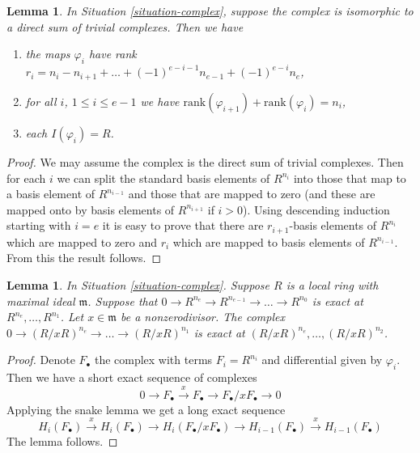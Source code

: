 \documentclass{amsart}
\theoremstyle{plain}
\newtheorem{lemma}[subsection]{Lemma}
\theoremstyle{definition}
\theoremstyle{remark}
\numberwithin{equation}{subsection}
\begin{document}
\begin{lemma}
\label{lemma-trivial-case-exact}
In Situation \ref{situation-complex}, suppose the complex is
isomorphic to a direct sum of trivial complexes. Then
we have
\begin{enumerate}
\item the maps $\varphi_i$ have rank
$r_i = n_i - n_{i + 1} + \ldots + (-1)^{e-i-1} n_{e-1} + (-1)^{e-i} n_e$,
\item for all $i$, $1 \leq i \leq e - 1$ we have
$\text{rank}(\varphi_{i + 1}) + \text{rank}(\varphi_i) = n_i$,
\item each $I(\varphi_i) = R$.
\end{enumerate}
\end{lemma}

\begin{proof}
We may assume the complex is the direct sum of trivial
complexes. Then for each $i$ we can split the standard basis
elements of $R^{n_i}$ into those that map to a basis element
of $R^{n_{i-1}}$ and those that are mapped to zero (and these
are mapped onto by basis elements of $R^{n_{i + 1}}$ if $i > 0$).
Using descending
induction starting with $i = e$ it is easy to prove that there
are $r_{i + 1}$-basis elements of $R^{n_i}$ which are mapped
to zero and $r_i$ which are mapped to basis elements of
$R^{n_{i-1}}$. From this the result follows.
\end{proof}


\begin{lemma}
\label{lemma-div-x-exact-one-less}
In Situation \ref{situation-complex}. Suppose $R$ is
a local ring with maximal ideal $\mathfrak m$.
Suppose that $0 \to R^{n_e} \to R^{n_{e-1}} \to \ldots \to R^{n_0}$
is exact at $R^{n_e}, \ldots, R^{n_1}$.
Let $x \in \mathfrak m$ be a nonzerodivisor. The complex
$0 \to (R/xR)^{n_e} \to \ldots \to (R/xR)^{n_1}$
is exact at $(R/xR)^{n_e}, \ldots, (R/xR)^{n_2}$.
\end{lemma}

\begin{proof}
Denote $F_\bullet$ the complex with terms $F_i = R^{n_i}$
and differential given by $\varphi_i$. Then we have a short
exact sequence of complexes
$$
0 \to F_\bullet \xrightarrow{x} F_\bullet \to F_\bullet/xF_\bullet \to 0
$$
Applying the snake lemma we get a long exact sequence
$$
H_i(F_\bullet) \xrightarrow{x} H_i(F_\bullet) \to
H_i(F_\bullet/xF_\bullet) \to H_{i - 1}(F_\bullet)
\xrightarrow{x} H_{i - 1}(F_\bullet)
$$
The lemma follows.
\end{proof}
\end{document}
